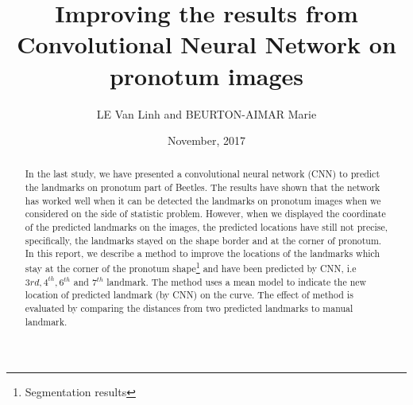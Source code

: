 \documentclass[12pt,a4paper]{article}
\begin{document}
\title{Improving the results from Convolutional Neural Network on pronotum images}
\author{LE Van Linh and BEURTON-AIMAR Marie}
\date{November, 2017}
\maketitle
\begin{abstract}
In the last study, we have presented a convolutional neural network (CNN) to predict the landmarks on pronotum part of Beetles. The results have shown that the network has worked well when it can be detected the landmarks on pronotum images when we considered on the side of statistic problem. However, when we displayed the coordinate of the predicted landmarks on the images, the predicted locations have still not precise, specifically, the landmarks stayed on the shape border and at the corner of pronotum. In this report, we describe a method to improve the locations of the landmarks which stay at the corner of the pronotum shape\footnote{Segmentation results} and have been predicted by CNN, i.e $3{rd}, 4^{th}, 6^{th}$ and $7^{th}$ landmark. The method uses a mean model to indicate the new location of predicted landmark (by CNN) on the curve. The effect of method is evaluated by comparing the distances from two predicted landmarks to manual landmark.
\end{abstract}
\end{document}
